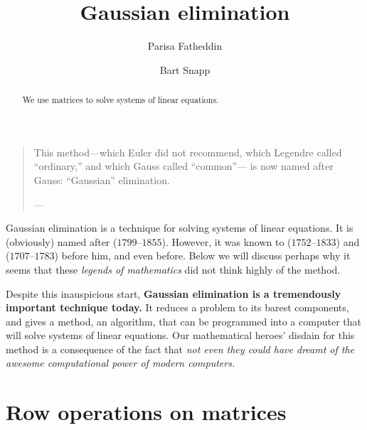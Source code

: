 \documentclass{ximera}
\author{Parisa Fatheddin \and Bart Snapp}
\title{Gaussian elimination}
\begin{document}
\begin{abstract}
  We use matrices to solve systems of linear equations.
\end{abstract}
\maketitle

\begin{quote}
  This method---which Euler did not recommend, which Legendre called ``ordinary,'' and which Gauss called ``common''--- is now named after Gauss: ``Gaussian'' elimination.


\hfill ---
\end{quote}

Gaussian elimination is a technique for solving systems of linear
equations. It is (obviously) named after
($1799$--$1855$). However, it was known to
($1752$--$1833$) and
($1707$--$1783$) before him, and even before. Below we will discuss
perhaps why it seems that these \textit{legends of mathematics} did
not think highly of the method.






Despite this inauspicious start, \textbf{Gaussian elimination is a
  tremendously important technique today.} It reduces a problem to
its barest components, and gives a method, an algorithm, that can be
programmed into a computer that will solve systems of linear
equations. Our mathematical heroes' disdain for this method is a
consequence of the fact that \textit{not even they could have dreamt of the awesome
computational power of modern computers.}



\section{Row operations on matrices}
\end{document}
